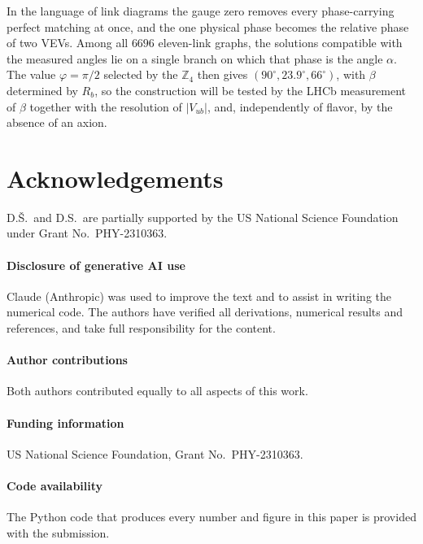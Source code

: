 \documentclass[submission, Phys]{SciPost}
\newcommand{\Z}{\mathbb{Z}}
\begin{document}
In the language of link diagrams the gauge zero removes every
phase-carrying perfect matching at once, and the one physical phase
becomes the relative phase of two VEVs. Among all $6696$ eleven-link
graphs, the solutions compatible with the measured angles lie on a
single branch on which that phase is the angle $\alpha$. The value
$\varphi=\pi/2$ selected by the $\Z_4$ then gives $(90^\circ,23.9^\circ,66^\circ)$, with $\beta$
determined by $R_b$, so the construction will be tested by the LHCb
measurement of $\beta$ together with the resolution of $|V_{ub}|$, and,
independently of flavor, by the absence of an axion.

\section*{Acknowledgements}
D.\v{S}.\ and D.S.\ are partially supported by the US National Science
Foundation under Grant No.\ PHY-2310363.

\paragraph{Disclosure of generative AI use}
Claude (Anthropic) was used to improve the text and to assist in
writing the numerical code. The authors have verified all derivations,
numerical results and references, and take full responsibility for the
content.

\paragraph{Author contributions}
Both authors contributed equally to all aspects of this work.

\paragraph{Funding information}
US National Science Foundation, Grant No.\ PHY-2310363.

\paragraph{Code availability}
The Python code that produces every number and figure in this paper
is provided with the submission.
\end{document}
